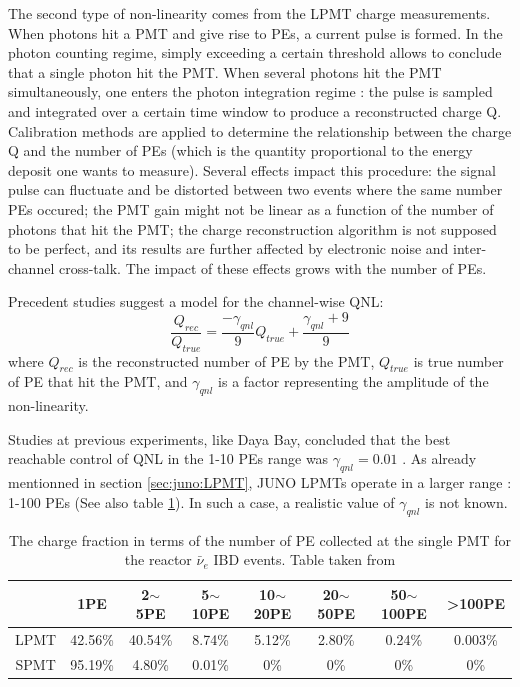 \documentclass[../main.tex]{subfiles}
\begin{document}
The second type of non-linearity comes from the LPMT charge measurements. When photons hit a PMT and give rise to PEs, a current pulse is formed. In the photon counting regime, simply exceeding a certain threshold allows to conclude that a single photon hit the PMT. When several photons hit the PMT simultaneously, one enters the photon integration regime : the pulse is sampled and integrated over a certain time window to produce a reconstructed charge Q. Calibration methods are applied to determine the relationship between the charge Q and the number of PEs (which is the quantity proportional to the energy deposit one wants to measure). Several effects impact this procedure: the signal pulse can fluctuate and be distorted between two events where the same number PEs occured; the PMT gain might not be linear as a function of the number of photons that hit the PMT; the charge reconstruction algorithm is not supposed to be perfect, and its results are further affected by electronic noise and inter-channel cross-talk. The impact of these effects grows with the number of PEs.

Precedent studies \cite{han_dual_2021} suggest a model for the channel-wise QNL:
\begin{equation}
  \label{eq:joint_fit:gamma_yang}
  \frac{Q_{rec}}{Q_{true}} = \frac{-\gamma_{qnl}}{9} Q_{true} + \frac{\gamma_{qnl} + 9}{9}
\end{equation}
where $Q_{rec}$ is the reconstructed number of PE by the PMT, $Q_{true}$ is true number of PE that hit the PMT, and $\gamma_{qnl}$ is a factor representing the amplitude of the non-linearity.

Studies at previous experiments, like Daya Bay, concluded that the best reachable control of QNL in the 1-10 PEs range was $\gamma_{qnl}=0.01$ \cite{collaboration_high_2019}.
As already mentionned in section \ref{sec:juno:LPMT}, JUNO LPMTs operate in a larger range : 1-100 PEs (See also table \ref{tab:joint_fit:charge_frac}). In such a case, a realistic value of $\gamma_{qnl}$ is not known.

\begin{table}[ht]
  \centering
  \begin{tabular}{c|c|c|c|c|c|c|c}
        &1PE &2$\sim$5PE& 5$\sim$10PE & 10$\sim$20PE & 20$\sim$50PE & 50$\sim$100PE & >100PE \\
      \hline
    LPMT &42.56\% & 40.54\% & 8.74\% & 5.12\% & 2.80\% & 0.24\% & 0.003\% \\
    SPMT &95.19\% & 4.80\%  & 0.01\% & 0\%    & 0\%    & 0\%    & 0\% \\
    \hline
  \end{tabular}
  \caption{The charge fraction in terms of the number of PE collected at the single PMT for the reactor $\bar{\nu}_e$ IBD events. Table taken from \cite{han_dual_2021}}
  \label{tab:joint_fit:charge_frac}
\end{table}
\end{document}

